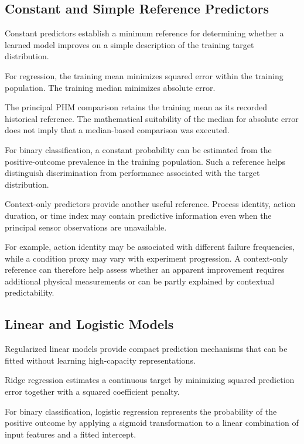 \subsection{Constant and Simple Reference Predictors}

Constant predictors establish a minimum reference for determining whether a learned model improves on a simple description of the training target distribution.

For regression, the training mean minimizes squared error within the training population. The training median minimizes absolute error.

The principal PHM comparison retains the training mean as its recorded historical reference. The mathematical suitability of the median for absolute error does not imply that a median-based comparison was executed.

For binary classification, a constant probability can be estimated from the positive-outcome prevalence in the training population. Such a reference helps distinguish discrimination from performance associated with the target distribution.

Context-only predictors provide another useful reference. Process identity, action duration, or time index may contain predictive information even when the principal sensor observations are unavailable.

For example, action identity may be associated with different failure frequencies, while a condition proxy may vary with experiment progression. A context-only reference can therefore help assess whether an apparent improvement requires additional physical measurements or can be partly explained by contextual predictability.

\subsection{Linear and Logistic Models}

Regularized linear models provide compact prediction mechanisms that can be fitted without learning high-capacity representations.

Ridge regression estimates a continuous target by minimizing squared prediction error together with a squared coefficient penalty.

For binary classification, logistic regression represents the probability of the positive outcome by applying a sigmoid transformation to a linear combination of input features and a fitted intercept.

